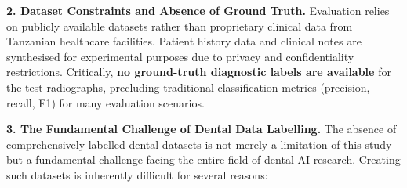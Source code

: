 \documentclass[12pt,a4paper]{report}
\begin{document}
	\textbf{2. Dataset Constraints and Absence of Ground Truth.} Evaluation relies on publicly available datasets rather than proprietary clinical data from Tanzanian healthcare facilities. Patient history data and clinical notes are synthesised for experimental purposes due to privacy and confidentiality restrictions. Critically, \textbf{no ground-truth diagnostic labels are available} for the test radiographs, precluding traditional classification metrics (precision, recall, F1) for many evaluation scenarios.
	
	\textbf{3. The Fundamental Challenge of Dental Data Labelling.} The absence of comprehensively labelled dental datasets is not merely a limitation of this study but a fundamental challenge facing the entire field of dental AI research. Creating such datasets is inherently difficult for several reasons:
	
\end{document}
